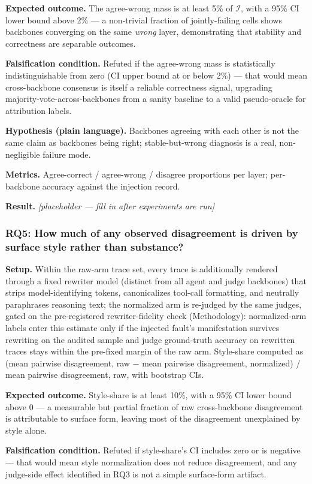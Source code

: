 \documentclass[11pt]{article}
\newcommand{\ph}{\textit{[placeholder --- fill in after experiments are run]}}
\begin{document}
\textbf{Expected outcome.} The agree-wrong mass is at least 5\% of $\mathcal{I}$, with a 95\% CI lower bound above 2\% --- a non-trivial fraction of jointly-failing cells shows backbones converging on the same \emph{wrong} layer, demonstrating that stability and correctness are separable outcomes.

\textbf{Falsification condition.} Refuted if the agree-wrong mass is statistically indistinguishable from zero (CI upper bound at or below 2\%) --- that would mean cross-backbone consensus is itself a reliable correctness signal, upgrading majority-vote-across-backbones from a sanity baseline to a valid pseudo-oracle for attribution labels.

\textbf{Hypothesis (plain language).} Backbones agreeing with each other is not the same claim as backbones being right; stable-but-wrong diagnosis is a real, non-negligible failure mode.

\textbf{Metrics.} Agree-correct / agree-wrong / disagree proportions per layer; per-backbone accuracy against the injection record.

\textbf{Result.} \ph

\subsubsection{RQ5: How much of any observed disagreement is driven by surface style rather than substance?}
\textbf{Setup.} Within the raw-arm trace set, every trace is additionally rendered through a fixed rewriter model (distinct from all agent and judge backbones) that strips model-identifying tokens, canonicalizes tool-call formatting, and neutrally paraphrases reasoning text; the normalized arm is re-judged by the same judges, gated on the pre-registered rewriter-fidelity check (Methodology): normalized-arm labels enter this estimate only if the injected fault's manifestation survives rewriting on the audited sample and judge ground-truth accuracy on rewritten traces stays within the pre-fixed margin of the raw arm. Style-share computed as (mean pairwise disagreement, raw $-$ mean pairwise disagreement, normalized) / mean pairwise disagreement, raw, with bootstrap CIs.

\textbf{Expected outcome.} Style-share is at least 10\%, with a 95\% CI lower bound above 0 --- a measurable but partial fraction of raw cross-backbone disagreement is attributable to surface form, leaving most of the disagreement unexplained by style alone.

\textbf{Falsification condition.} Refuted if style-share's CI includes zero or is negative --- that would mean style normalization does not reduce disagreement, and any judge-side effect identified in RQ3 is not a simple surface-form artifact.
\end{document}
